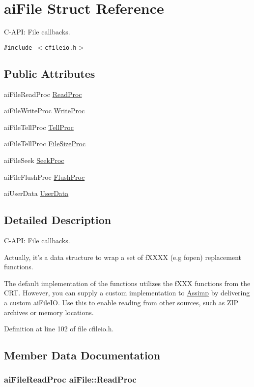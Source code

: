 \hypertarget{structai_file}{
\section{aiFile Struct Reference}
\label{structai_file}
}
C-API: File callbacks.  


{\tt \#include $<$cfileio.h$>$}

\subsection*{Public Attributes}
\begin{CompactItemize}
\item 
aiFileReadProc \hyperlink{structai_file_52287e81ca67b9d43cc1ce6142f781fa}{ReadProc}
\item 
aiFileWriteProc \hyperlink{structai_file_b9fca3a62e34a33592c13a6f31db7d1d}{WriteProc}
\item 
aiFileTellProc \hyperlink{structai_file_af2d88a3b2fcbdacf51119658283d27e}{TellProc}
\item 
aiFileTellProc \hyperlink{structai_file_ff2fff8c0458e7ec71f7de217c3a3033}{FileSizeProc}
\item 
aiFileSeek \hyperlink{structai_file_7a07b499be4ad433669246479a4d4ad2}{SeekProc}
\item 
aiFileFlushProc \hyperlink{structai_file_1102d28d1c0be68ffed20476669bdb0d}{FlushProc}
\item 
aiUserData \hyperlink{structai_file_ec528fa18f4755fe4f28d604fde28aad}{UserData}
\end{CompactItemize}


\subsection{Detailed Description}
C-API: File callbacks. 

Actually, it's a data structure to wrap a set of fXXXX (e.g fopen) replacement functions.

The default implementation of the functions utilizes the fXXX functions from the CRT. However, you can supply a custom implementation to \hyperlink{namespace_assimp}{Assimp} by delivering a custom \hyperlink{structai_file_i_o}{aiFileIO}. Use this to enable reading from other sources, such as ZIP archives or memory locations. 

Definition at line 102 of file cfileio.h.

\subsection{Member Data Documentation}
\hypertarget{structai_file_52287e81ca67b9d43cc1ce6142f781fa}{
\subsubsection[ReadProc]{\setlength{\rightskip}{0pt plus 5cm}aiFileReadProc {\bf aiFile::ReadProc}}}
\label{structai_file_52287e81ca67b9d43cc1ce6142f781fa}


